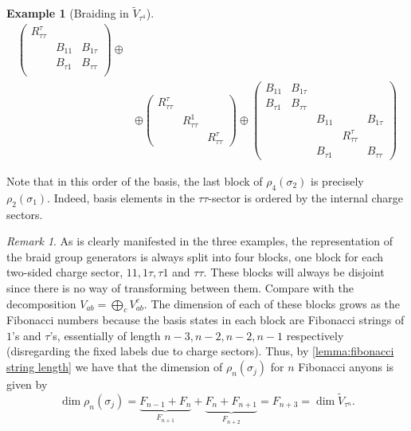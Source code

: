 \documentclass[a4paper,10pt,oneside]{book}
\theoremstyle{plain}
\theoremstyle{definition}
\newtheorem{example}{Example}[section]
\theoremstyle{remark}
\newtheorem{remark}{Remark}[section]
\begin{document}
\begin{example}[Braiding in $\widetilde{V}_{τ^4}$]
\begin{equation}
\begin{aligned}
\begin{pmatrix}
        R_{ττ}^τ \\
        & B_{11} & B_{1τ} \\
        & B_{τ1} & B_{ττ} \\
      \end{pmatrix}
      \oplus \\
      & \oplus
      \begin{pmatrix}
        R_{ττ}^τ \\
        & R_{ττ}^1 \\
        & & R_{ττ}^τ
      \end{pmatrix}
      \oplus
      \begin{pmatrix}
        B_{11} & B_{1τ} \\
        B_{τ1} & B_{ττ} \\
        & & B_{11} & & B_{1τ} \\
        & & & R_{ττ}^τ \\
        & & B_{τ1} & & B_{ττ}
      \end{pmatrix}
    \end{aligned}
  \end{equation}

  Note that in this order of the basis, the last block of $ρ_{4}(σ_2)$ is precisely $ρ_2(σ_1)$. Indeed, basis elements in the $ττ$-sector is ordered by the internal charge sectors.
\end{example}

\begin{remark}\label{remark:fibonacci sigma dimension}
  As is clearly manifested in the three examples, the representation of the braid group generators is always split into four blocks, one block for each two-sided charge sector, $11, 1τ, τ1$ and $ττ$. These blocks will always be disjoint since there is no way of transforming between them. Compare with the decomposition $V_{ab} = \bigoplus_c V_{ab}^c$. The dimension of each of these blocks grows as the Fibonacci numbers because the basis states in each block are Fibonacci strings of $1$'s and $τ$'s, essentially of length $n-3, n-2, n-2, n-1$ respectively (disregarding the fixed labels due to charge sectors). Thus, by \cref{lemma:fibonacci string length} we have that the dimension of $ρ_n(σ_j)$ for $n$ Fibonacci anyons is given by
  \begin{equation}
    \operatorname{dim} ρ_n (σ_j) = \underbrace{F_{n-1} + F_{n}}_{F_{n+1}} + \underbrace{F_{n} + F_{n+1}}_{F_{n+2}} = F_{n+3} = \dim \widetilde{V}_{\tau^n}.
  \end{equation}
\end{remark}
\end{document}
